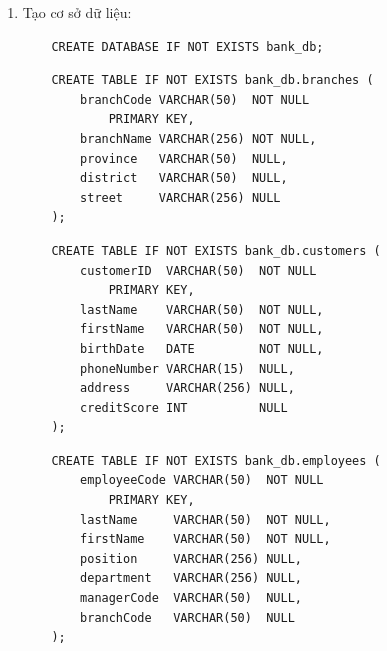


\begin{enumerate}[label=\alph*.]

    \item Tạo cơ sở dữ liệu:
    
    \begin{lstlisting}
    CREATE DATABASE IF NOT EXISTS bank_db;
    \end{lstlisting}
    
        
    \begin{lstlisting}
    CREATE TABLE IF NOT EXISTS bank_db.branches (
        branchCode VARCHAR(50)  NOT NULL 
            PRIMARY KEY,
        branchName VARCHAR(256) NOT NULL,
        province   VARCHAR(50)  NULL,
        district   VARCHAR(50)  NULL,
        street     VARCHAR(256) NULL
    );
    \end{lstlisting}

        
    \begin{lstlisting}
    CREATE TABLE IF NOT EXISTS bank_db.customers (
        customerID  VARCHAR(50)  NOT NULL 
            PRIMARY KEY,
        lastName    VARCHAR(50)  NOT NULL,
        firstName   VARCHAR(50)  NOT NULL,
        birthDate   DATE         NOT NULL,
        phoneNumber VARCHAR(15)  NULL,
        address     VARCHAR(256) NULL,
        creditScore INT          NULL
    );
    \end{lstlisting}

    \newpage

        
    \begin{lstlisting}
    CREATE TABLE IF NOT EXISTS bank_db.employees (
        employeeCode VARCHAR(50)  NOT NULL 
            PRIMARY KEY,
        lastName     VARCHAR(50)  NOT NULL,
        firstName    VARCHAR(50)  NOT NULL,
        position     VARCHAR(256) NULL,
        department   VARCHAR(256) NULL,
        managerCode  VARCHAR(50)  NULL,
        branchCode   VARCHAR(50)  NULL
    );
    \end{lstlisting}


\end{enumerate}
